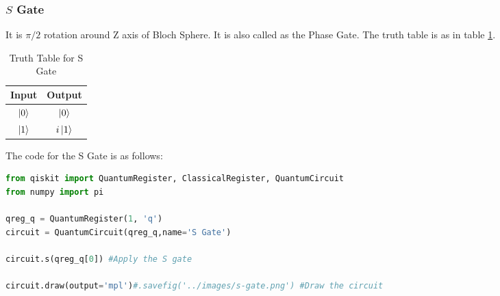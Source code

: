 \subsubsection{$S$ Gate}
It is $\pi/2$ rotation around Z axis of Bloch Sphere.
It is also called as the Phase Gate. The truth table is as in table \ref{tab:s}.
\begin{table}[ht]
    \centering
    \begin{tabular}{|c|c|}
        \hline
        Input & Output\\
        \hline
        $\ket{0}$ & $\ket{0}$\\
        $\ket{1}$ & $i\ket{1}$\\
        \hline
    \end{tabular}
    \caption{Truth Table for S Gate}
    \label{tab:s}
\end{table}
The code for the S Gate is as follows:
\begin{lstlisting}[language=Python]
from qiskit import QuantumRegister, ClassicalRegister, QuantumCircuit
from numpy import pi

qreg_q = QuantumRegister(1, 'q')
circuit = QuantumCircuit(qreg_q,name='S Gate')

circuit.s(qreg_q[0]) #Apply the S gate

circuit.draw(output='mpl')#.savefig('../images/s-gate.png') #Draw the circuit
\end{lstlisting}

